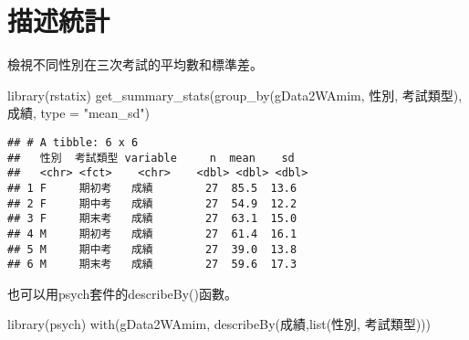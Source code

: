 \documentclass[
]{book}
\newenvironment{Shaded}{\begin{snugshade}}{\end{snugshade}}
\newcommand{\AttributeTok}[1]{\textcolor[rgb]{0.77,0.63,0.00}{#1}}
\newcommand{\FunctionTok}[1]{\textcolor[rgb]{0.00,0.00,0.00}{#1}}
\newcommand{\NormalTok}[1]{#1}
\newcommand{\StringTok}[1]{\textcolor[rgb]{0.31,0.60,0.02}{#1}}
\begin{document}
\hypertarget{ux63cfux8ff0ux7d71ux8a08-3}{%
\section{描述統計}\label{ux63cfux8ff0ux7d71ux8a08-3}}

檢視不同性別在三次考試的平均數和標準差。

\begin{Shaded}
\begin{Highlighting}[]
\FunctionTok{library}\NormalTok{(rstatix)}
\FunctionTok{get\_summary\_stats}\NormalTok{(}\FunctionTok{group\_by}\NormalTok{(gData2WAmim, 性別, 考試類型), 成績, }\AttributeTok{type =} \StringTok{"mean\_sd"}\NormalTok{)}
\end{Highlighting}
\end{Shaded}

\begin{verbatim}
## # A tibble: 6 x 6
##   性別  考試類型 variable     n  mean    sd
##   <chr> <fct>    <chr>    <dbl> <dbl> <dbl>
## 1 F     期初考   成績        27  85.5  13.6
## 2 F     期中考   成績        27  54.9  12.2
## 3 F     期末考   成績        27  63.1  15.0
## 4 M     期初考   成績        27  61.4  16.1
## 5 M     期中考   成績        27  39.0  13.8
## 6 M     期末考   成績        27  59.6  17.3
\end{verbatim}

也可以用psych套件的describeBy()函數。

\begin{Shaded}
\begin{Highlighting}[]
\FunctionTok{library}\NormalTok{(psych)}
\FunctionTok{with}\NormalTok{(gData2WAmim, }\FunctionTok{describeBy}\NormalTok{(成績,}\FunctionTok{list}\NormalTok{(性別, 考試類型)))}
\end{Highlighting}
\end{Shaded}
\end{document}
